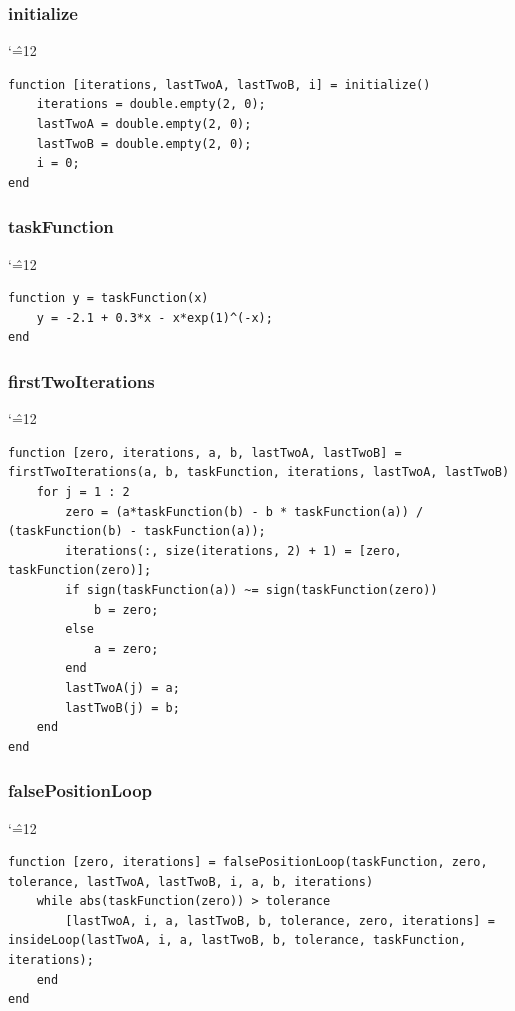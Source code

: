 \documentclass[12pt]{report}
\newenvironment{simplechar}{%
   \catcode`\^=12
}{}
\begin{document}
\subsubsection{initialize}
\begin{simplechar}
\begin{lstlisting}
function [iterations, lastTwoA, lastTwoB, i] = initialize()
    iterations = double.empty(2, 0);
    lastTwoA = double.empty(2, 0);
    lastTwoB = double.empty(2, 0);
    i = 0;
end
\end{lstlisting}
\end{simplechar}

\subsubsection{taskFunction}
\begin{simplechar}
\begin{lstlisting}
function y = taskFunction(x)
    y = -2.1 + 0.3*x - x*exp(1)^(-x);
end
\end{lstlisting}
\end{simplechar}

\newpage
\subsubsection{firstTwoIterations}
\begin{simplechar}
\begin{lstlisting}
function [zero, iterations, a, b, lastTwoA, lastTwoB] = firstTwoIterations(a, b, taskFunction, iterations, lastTwoA, lastTwoB)
    for j = 1 : 2
        zero = (a*taskFunction(b) - b * taskFunction(a)) / (taskFunction(b) - taskFunction(a));
        iterations(:, size(iterations, 2) + 1) = [zero, taskFunction(zero)];
        if sign(taskFunction(a)) ~= sign(taskFunction(zero))
            b = zero;
        else
            a = zero;
        end
        lastTwoA(j) = a;
        lastTwoB(j) = b;
    end
end
\end{lstlisting}
\end{simplechar}

\subsubsection{falsePositionLoop}
\begin{simplechar}
\begin{lstlisting}
function [zero, iterations] = falsePositionLoop(taskFunction, zero, tolerance, lastTwoA, lastTwoB, i, a, b, iterations)
    while abs(taskFunction(zero)) > tolerance
        [lastTwoA, i, a, lastTwoB, b, tolerance, zero, iterations] = insideLoop(lastTwoA, i, a, lastTwoB, b, tolerance, taskFunction, iterations);
    end
end
\end{lstlisting}
\end{simplechar}
\end{document}
